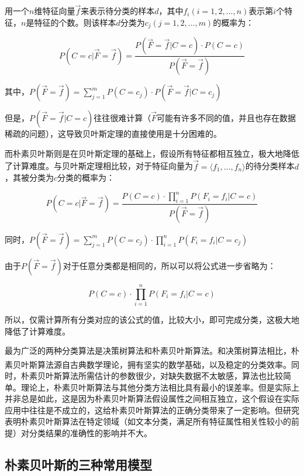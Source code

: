 \documentclass[UTF8,zihao=-4]{ctexart}
\newcommand{\upcite}[1]{\textsuperscript{\cite{#1}}}
\begin{document}
	用一个$n$维特征向量$\vec{f}$来表示待分类的样本$d$，其中$f_i(i=1,2,...,n)$表示第$i$个特征，$n$是特征的个数。则该样本$d$分类为$c_j(j=1,2,...,m)$的概率为：
	
	\begin{equation}
	\label{equ:nb}
	P(C=c|\vec{F}=\vec{f})=\frac{P(\vec{F}=\vec{f}|C=c)\cdot P(C=c) } {P(\vec{F}=\vec{f})}
	\end{equation}
	
	其中，$P(\vec{F}=\vec{f})=\sum\limits_{j=1}^{m} P(C=c_j) \cdot P(\vec{F}=\vec{f}|C=c_j)$
	
	但是，$P(\vec{F}=\vec{f}|C=c)$往往很难计算（$\vec{F}$可能有许多不同的值，并且也存在数据稀疏的问题），这导致贝叶斯定理的直接使用是十分困难的。
	
	而朴素贝叶斯则是在贝叶斯定理的基础上，假设所有特征都相互独立，极大地降低了计算难度。与贝叶斯定理相比较，对于特征向量为$\vec{f}=\langle f_1, \ldots, f_n \rangle$的待分类样本$d$，其被分类为$c$分类的概率为：
	
	\begin{equation}
	P(C=c|\vec{F}=\vec{f})=\frac{P(C=c) \cdot \prod\limits_{i=1}^{n} P(F_i=f_i|C=c)} {P(\vec{F}=\vec{f})}
	\end{equation}
		
	同时，$P(\vec{F}=\vec{f})=\sum\limits_{j=1}^{m} P(C=c_j) \cdot \prod\limits_{i=1}^{n}  P(F_i=f_i|C=c_j)$
	
	由于$P(\vec{F}=\vec{f})$对于任意分类都是相同的，所以可以将公式进一步省略为：
	
	\begin{equation}
	P(C=c) \cdot \prod\limits_{i=1}^{n} P(F_i=f_i|C=c)
	\end{equation}
	
	所以，仅需计算所有分类对应的该公式的值，比较大小，即可完成分类，这极大地降低了计算难度。
	
	最为广泛的两种分类算法是决策树算法和朴素贝叶斯算法。和决策树算法相比，朴素贝叶斯算法源自古典数学理论，拥有坚实的数学基础，以及稳定的分类效率\upcite{nb}。同时，朴素贝叶斯算法所需估计的参数很少，对缺失数据不太敏感，算法也比较简单。理论上，朴素贝叶斯算法与其他分类方法相比具有最小的误差率。但是实际上并非总是如此，这是因为朴素贝叶斯算法假设属性之间相互独立，这个假设在实际应用中往往是不成立的，这给朴素贝叶斯算法的正确分类带来了一定影响。但研究表明朴素贝叶斯算法在特定领域（如文本分类，满足所有特征属性相关性较小的前提）对分类结果的准确性的影响并不大。

	
\subsection{朴素贝叶斯的三种常用模型}
\end{document}
